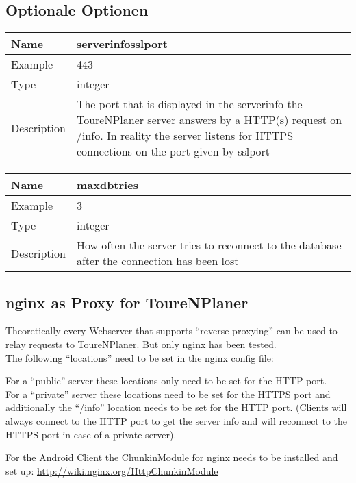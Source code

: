 \documentclass[ngerman,titlepage,parskip=true]{scrartcl}
\newcommand{\configoption}[4]
{%
\setlength{\extrarowheight}{2pt}
\begin{tabular}{|p{0.2\textwidth}|p{0.9\textwidth}|}
\hline
  \textbf{Name} & \textbf{#1}\\\hline
  Example & #2\\\hline
  Type & #3\\\hline
  Description & #4\\\hline
\end{tabular}
}
\begin{document}
\subsection{Optionale Optionen}

\configoption
{serverinfosslport}
{443}
{integer}
{The port that is displayed in the serverinfo the ToureNPlaner server answers by a HTTP(s) request on /info. In reality the server listens for HTTPS connections on the port given by sslport}

\configoption
{maxdbtries}
{3}
{integer}
{How often the server tries to reconnect to the database after the connection has been lost}

\subsection{nginx as Proxy for ToureNPlaner}

Theoretically every Webserver that supports ``reverse proxying'' can be used to relay requests to ToureNPlaner. But only nginx has been tested.\\

The following ``locations'' need to be set in the nginx config file:



For a ``public'' server these locations only need to be set for the HTTP port.\\
For a ``private'' server these locations need to be set for the HTTPS port and additionally the ``/info'' location needs to be set for the HTTP port. (Clients will always connect to the HTTP port to get the server info and will reconnect to the HTTPS port in case of a private server).

For the Android Client the ChunkinModule for nginx needs to be installed and set up:
\url{http://wiki.nginx.org/HttpChunkinModule}
\end{document}

